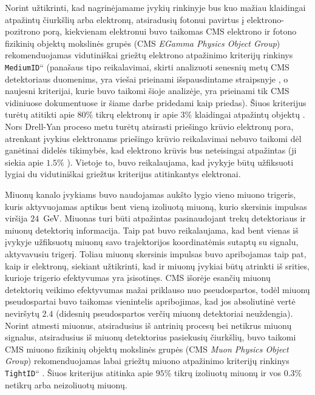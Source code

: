 \documentclass[a4paper, 12pt, oneside]{article}
\newcommand{\ttt}[1]{\texttt{#1}}
\newcommand{\ltq}[1]{{\quotedblbase{}#1\textquotedblleft{}}}
\newlength\q
\begin{document}
Norint užtikrinti, kad nagrinėjamame įvykių rinkinyje bus kuo mažiau klaidingai atpažintų čiurkšlių arba elektronų,
atsiradusių fotonui pavirtus į elektrono-pozitrono porą, kiekvienam elektronui buvo taikomas CMS elektrono ir fotono
fizikinių objektų mokslinės grupės (CMS \textit{EGamma Physics Object Group}) rekomenduojamas vidutiniškai griežtų
elektrono atpažinimo kriterijų rinkinys \ltq{\ttt{MediumID}} (panašaus tipo reikalavimai, skirti analizuoti senesnių
metų CMS detektoriaus duomenims, yra viešai prieinami išspausdintame straipsnyje \cite{EleID}, o naujesni kriterijai,
kurie buvo taikomi šioje analizėje, yra prieinami tik CMS vidiniuose dokumentuose ir šiame darbe pridedami kaip priedas).
Šiuos kriterijus turėtų atitikti apie $80\%$ tikrų elektronų ir apie $3\%$ klaidingai atpažintų objektų \cite{EleID}.
Nors Drell-Yan proceso metu turėtų atsirasti priešingo krūvio elektronų pora, atrenkant įvykius elektronams priešingo
krūvio reikalavimai nebuvo taikomi dėl ganėtinai didelės tikimybės, kad elektrono krūvis bus neteisingai atpažintas
(ji siekia apie $1.5\%$ \cite{EleID}).
Vietoje to, buvo reikalaujama, kad įvykyje būtų užfiksuoti lygiai du vidutiniškai griežtus kriterijus atitinkantys
elektronai.

Miuonų kanalo įvykiams buvo naudojamas aukšto lygio vieno miuono trigeris, kuris aktyvuojamas aptikus bent vieną izoliuotą
miuoną, kurio skersinis impulsas viršija $24$~GeV.
Miuonas turi būti atpažintas pasinaudojant trekų detektoriaus ir miuonų detektorių informacija.
Taip pat buvo reikalaujama, kad bent vienas iš įvykyje užfiksuotų miuonų savo trajektorijos koordinatėmis sutaptų su signalu,
aktyvavusiu trigerį.
Toliau miuonų skersinis impulsas buvo apribojamas taip pat, kaip ir elektronų, siekiant užtikrinti, kad ir miuonų įvykiai
būtų atrinkti iš srities, kurioje trigerio efektyvumas yra įsisotinęs.
CMS išorėje esančių miuonų detektorių veikimo efektyvumas mažai priklauso nuo pseudospartos, todėl miuonų pseudospartai
buvo taikomas vienintelis apribojimas, kad jos absoliutinė vertė neviršytų $2.4$ (didesnių pseudospartos verčių
miuonų detektoriai neuždengia).
Norint atmesti miuonus, atsiradusius iš antrinių procesų bei netikrus miuonų signalus, atsiradusius iš miuonų detektorius
pasiekusių čiurkšlių, buvo taikomi CMS miuono fizikinių objektų mokslinės grupės (CMS \textit{Muon Physics Object Group})
rekomenduojamas labai griežtų miuono atpažinimo kriterijų rinkinys \ltq{\ttt{TightID}} \cite{MuonID}.
Šiuos kriterijus atitinka apie $95\%$ tikrų izoliuotų miuonų ir vos $0.3\%$ netikrų arba neizoliuotų miuonų.
\end{document}
